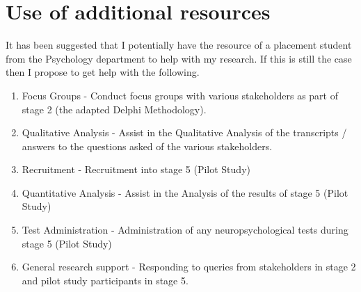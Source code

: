 \documentclass[11pt]{article}
\begin{document}
\section{Use of additional resources}
It has been suggested that I potentially have the resource of a placement student from the Psychology department to help with my research. If this is still the case then I propose to get help with the following.

\begin{enumerate}
	\item Focus Groups - Conduct focus groups with various stakeholders as part of stage 2 (the adapted Delphi Methodology).
	\item Qualitative Analysis - Assist in the Qualitative Analysis of the transcripts / answers to the questions asked of the various stakeholders. 
	\item Recruitment - Recruitment into stage 5 (Pilot Study)
	\item Quantitative Analysis - Assist in the Analysis of the results of stage 5 (Pilot Study)
	\item Test Administration - Administration of any neuropsychological tests during stage 5 (Pilot Study)
	\item General research support - Responding to queries from stakeholders in stage 2 and pilot study participants in stage 5.
\end{enumerate}
\end{document}
